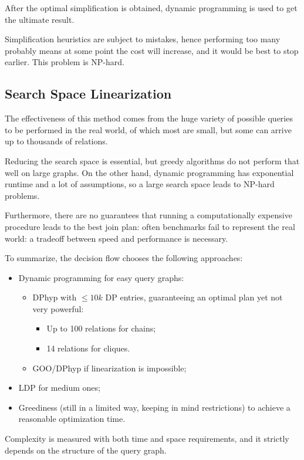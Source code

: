 After the optimal simplification is obtained, dynamic programming is used to get the ultimate result.

Simplification heuristics are subject to mistakes, hence performing too many probably means at some point the cost will increase, and it would be best to stop earlier. This problem is NP-hard.

\subsection{Search Space Linearization}
The effectiveness of this method comes from the huge variety of possible queries to be performed in the real world, of which most are small, but some can arrive up to thousands of relations.

Reducing the search space is essential, but greedy algorithms do not perform that well on large graphs. On the other hand, dynamic programming has exponential runtime and a lot of assumptions, so a large search space leads to NP-hard problems. 

Furthermore, there are no guarantees that running a computationally expensive procedure leads to the best join plan: often benchmarks fail to represent the real world: a tradeoff between speed and performance is necessary.

To summarize, the decision flow chooses the following approaches:
\begin{itemize}
	\item Dynamic programming for easy query graphs:
	\begin{itemize}
		\item DPhyp with $\leq 10k$ DP entries, guaranteeing an optimal plan yet not very powerful:
		\begin{itemize}
			\item Up to 100 relations for chains;
			\item 14 relations for cliques.
		\end{itemize}
		\item GOO/DPhyp if linearization is impossible;
	\end{itemize}
	\item LDP for medium ones;
	\item Greediness (still in a limited way, keeping in mind restrictions) to achieve a reasonable optimization time.
\end{itemize}

Complexity is measured with both time and space requirements, and it strictly depends on the structure of the query graph.

